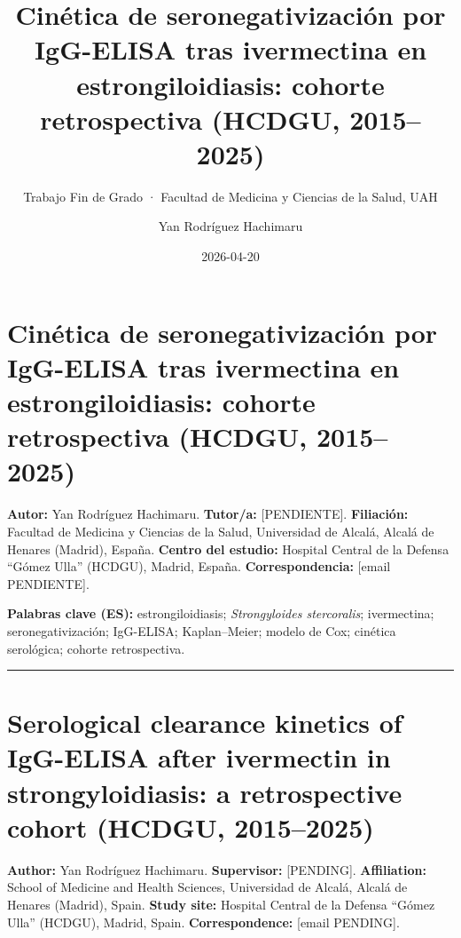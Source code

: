 \documentclass[
  spanish,
  12pt,
  a4paper,
]{article}
\title{Cinética de seronegativización por IgG-ELISA tras ivermectina en
estrongiloidiasis: cohorte retrospectiva (HCDGU, 2015--2025)}
\subtitle{Trabajo Fin de Grado · Facultad de Medicina y Ciencias de la
Salud, UAH}
\author{Yan Rodríguez Hachimaru}
\date{2026-04-20}
\begin{document}
\maketitle


\section*{Cinética de seronegativización por IgG-ELISA tras ivermectina
en estrongiloidiasis: cohorte retrospectiva (HCDGU,
2015--2025)}\label{cinuxe9tica-de-seronegativizaciuxf3n-por-igg-elisa-tras-ivermectina-en-estrongiloidiasis-cohorte-retrospectiva-hcdgu-20152025}

\textbf{Autor:} Yan Rodríguez Hachimaru. \textbf{Tutor/a:}
{[}PENDIENTE{]}. \textbf{Filiación:} Facultad de Medicina y Ciencias de
la Salud, Universidad de Alcalá, Alcalá de Henares (Madrid), España.
\textbf{Centro del estudio:} Hospital Central de la Defensa ``Gómez
Ulla'' (HCDGU), Madrid, España. \textbf{Correspondencia:} {[}email
PENDIENTE{]}.

\textbf{Palabras clave (ES):} estrongiloidiasis; \emph{Strongyloides
stercoralis}; ivermectina; seronegativización; IgG-ELISA; Kaplan--Meier;
modelo de Cox; cinética serológica; cohorte retrospectiva.

\begin{center}\rule{0.5\linewidth}{0.5pt}\end{center}

\section*{Serological clearance kinetics of IgG-ELISA after ivermectin
in strongyloidiasis: a retrospective cohort (HCDGU,
2015--2025)}\label{serological-clearance-kinetics-of-igg-elisa-after-ivermectin-in-strongyloidiasis-a-retrospective-cohort-hcdgu-20152025}

\textbf{Author:} Yan Rodríguez Hachimaru. \textbf{Supervisor:}
{[}PENDING{]}. \textbf{Affiliation:} School of Medicine and Health
Sciences, Universidad de Alcalá, Alcalá de Henares (Madrid), Spain.
\textbf{Study site:} Hospital Central de la Defensa ``Gómez Ulla''
(HCDGU), Madrid, Spain. \textbf{Correspondence:} {[}email PENDING{]}.
\end{document}
